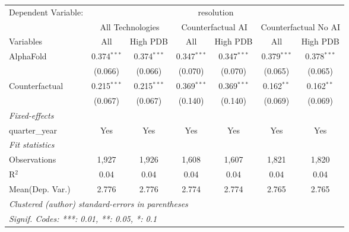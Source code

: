 \begingroup
\centering
\begin{tabular}{lcccccc}
   \tabularnewline \midrule \midrule
   Dependent Variable: & \multicolumn{6}{c}{resolution}\\
 & \multicolumn{2}{c}{All Technologies} & \multicolumn{2}{c}{Counterfactual AI} & \multicolumn{2}{c}{Counterfactual No AI} \\
\cmidrule(lr){1-1}\cmidrule(lr){2-3} \cmidrule(lr){4-5} \cmidrule(lr){6-7}
Variables & \multicolumn{1}{c}{All} & \multicolumn{1}{c}{High PDB} & \multicolumn{1}{c}{All} & \multicolumn{1}{c}{High PDB} & \multicolumn{1}{c}{All} & \multicolumn{1}{c}{High PDB} \\
\cmidrule(lr){1-1}\cmidrule(lr){2-2} \cmidrule(lr){3-3} \cmidrule(lr){4-4} \cmidrule(lr){5-5} \cmidrule(lr){6-6} \cmidrule(lr){7-7}
   AlphaFold      & 0.374$^{***}$ & 0.374$^{***}$ & 0.347$^{***}$ & 0.347$^{***}$ & 0.379$^{***}$ & 0.378$^{***}$\\   
                  & (0.066)       & (0.066)       & (0.070)       & (0.070)       & (0.065)       & (0.065)\\   
   Counterfactual & 0.215$^{***}$ & 0.215$^{***}$ & 0.369$^{***}$ & 0.369$^{***}$ & 0.162$^{**}$  & 0.162$^{**}$\\   
                  & (0.067)       & (0.067)       & (0.140)       & (0.140)       & (0.069)       & (0.069)\\   
   \midrule
   \emph{Fixed-effects}\\
   quarter\_year  & Yes           & Yes           & Yes           & Yes           & Yes           & Yes\\  
   \midrule
   \emph{Fit statistics}\\
   Observations   & 1,927         & 1,926         & 1,608         & 1,607         & 1,821         & 1,820\\  
   R$^2$          & 0.04          & 0.04          & 0.04          & 0.04          & 0.04          & 0.04\\  
Mean(Dep. Var.) & 2.776 & 2.776 & 2.774 & 2.774 & 2.765 & 2.765 \\
   \midrule \midrule
   \multicolumn{7}{l}{\emph{Clustered (author) standard-errors in parentheses}}\\
   \multicolumn{7}{l}{\emph{Signif. Codes: ***: 0.01, **: 0.05, *: 0.1}}\\
\end{tabular}
\par\endgroup
